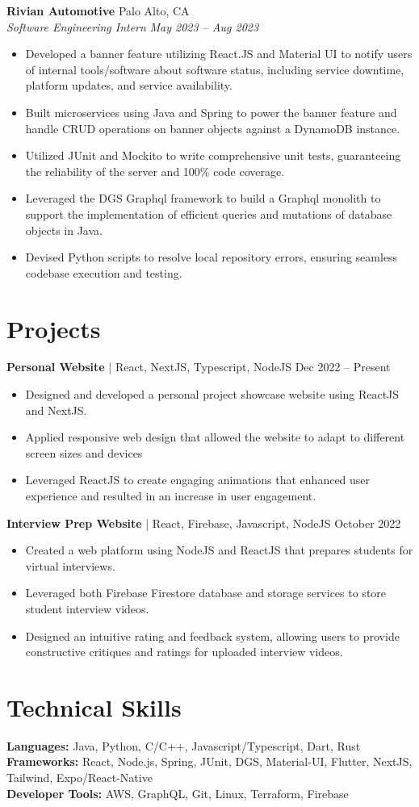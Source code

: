 \documentclass[11pt,letterpaper]{article}
\newcommand{\job}[4]{
  \textbf{#1} \hfill #2\\
  \textit{#3} \hfill \textit{#4}\\
}
\newcommand{\project}[2]{
  \textbf{#1} | #2
}
\begin{document}
\job{Rivian Automotive}{Palo Alto, CA}{Software Engineering Intern}{May 2023 – Aug 2023}
\begin{itemize}[leftmargin=*,nosep]
  \item Developed a banner feature utilizing React.JS and Material UI to notify users of internal tools/software about software status, including service downtime, platform updates, and service availability.
  \item Built microservices using Java and Spring to power the banner feature and handle CRUD operations on banner objects against a DynamoDB instance.
  \item Utilized JUnit and Mockito to write comprehensive unit tests, guaranteeing the reliability of the server and 100\% code coverage.
  \item Leveraged the DGS Graphql framework to build a Graphql monolith to support the implementation of efficient queries and mutations of database objects in Java.
  \item Devised Python scripts to resolve local repository errors, ensuring seamless codebase execution and testing.
\end{itemize}

\section{Projects}
\project{Personal Website}{React, NextJS, Typescript, NodeJS} \hfill Dec 2022 – Present
\begin{itemize}[leftmargin=*,nosep]
  \item Designed and developed a personal project showcase website using ReactJS and NextJS.
  \item Applied responsive web design that allowed the website to adapt to different screen sizes and devices
  \item Leveraged ReactJS to create engaging animations that enhanced user experience and resulted in an increase in user engagement.
\end{itemize}

\project{Interview Prep Website}{React, Firebase, Javascript, NodeJS} \hfill October 2022
\begin{itemize}[leftmargin=*,nosep]
  \item Created a web platform using NodeJS and ReactJS that prepares students for virtual interviews.
  \item Leveraged both Firebase Firestore database and storage services to store student interview videos.
  \item Designed an intuitive rating and feedback system, allowing users to provide constructive critiques and ratings for uploaded interview videos.
\end{itemize}

\section{Technical Skills}
\textbf{Languages:} Java, Python, C/C++, Javascript/Typescript, Dart, Rust\\
\textbf{Frameworks:} React, Node.js, Spring, JUnit, DGS, Material-UI, Flutter, NextJS, Tailwind, Expo/React-Native\\
\textbf{Developer Tools:} AWS, GraphQL, Git, Linux, Terraform, Firebase
\end{document}
